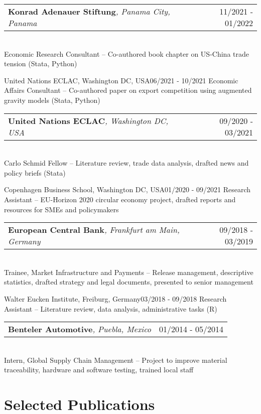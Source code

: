 \documentclass[A4,11pt]{article}
\makeatletter
\newcommand{\Subheading}[5]{   
    \begin{tabular*}{0.97\textwidth}[t]{l@{\extracolsep{\fill}}r}
      \textbf{#1}\textit{\small #2} & \small #3 
      \end{tabular*} \\
      \small #4 \\
    \vspace{7pt}
    }
\makeatother
\begin{document}
    \Subheading
        {Konrad Adenauer Stiftung}{, Panama City, Panama}{11/2021 - 01/2022}
        {Economic Research Consultant -- Co-authored book chapter on US-China trade tension (Stata, Python)}
            
    \Subheading
        {United Nations ECLAC}{, Washington DC, USA}{06/2021 - 10/2021}
        {Economic Affairs Consultant -- Co-authored paper on export competition using augmented gravity models (Stata, Python)}

    \Subheading
        {United Nations ECLAC}{, Washington DC, USA}{09/2020 - 03/2021}
        {Carlo Schmid Fellow -- Literature review, trade data analysis, drafted news and policy briefs  (Stata)}

    \Subheading
        {Copenhagen Business School}{, Washington DC, USA}{01/2020 - 09/2021}
        {Research Assistant -- EU-Horizon 2020 circular economy project, drafted reports and resources for SMEs and policymakers}

    \Subheading
        {European Central Bank}{, Frankfurt am Main, Germany}{09/2018 - 03/2019}
        {Trainee, Market Infrastructure and Payments -- Release management, descriptive statistics, drafted strategy and legal documents, presented to senior management}

    \Subheading
        {Walter Eucken Institute}{, Freiburg, Germany}{03/2018 - 09/2018}
        {Research Assistant -- Literature review, data analysis, administrative tasks (R)}

    \Subheading
        {Benteler Automotive}{, Puebla, Mexico}{01/2014 - 05/2014}
        {Intern, Global Supply Chain Management -- Project to improve material traceability, hardware and software testing, trained local staff}

\newpage
\section{Selected Publications}
\setlength{}
\begin{refsection}
\nocite{*}
\printbibliography[heading=none]
\end{refsection}
      

\end{document}
